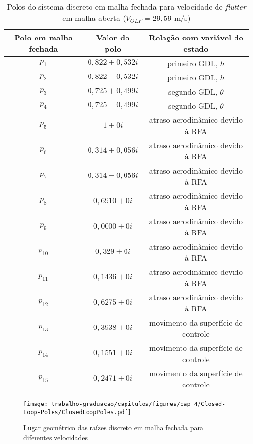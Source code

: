 \begin{table}[h]
\centering
\caption{Polos do sistema discreto em malha fechada para velocidade de \textit{flutter} em malha aberta ($V_{OLF} = 29,59$ m/s)}
\begin{tabular}{ccc} 
Polo em malha fechada & Valor do polo & Relação com variável de estado \\ \hline
$p_{1} $  & $0,822 + 0,532i$ & primeiro \gls{GDL}, $h$                  \\
$p_{2} $  & $0,822 - 0,532i$ & primeiro \gls{GDL}, $h$                  \\
$p_{3} $  & $0,725 + 0,499i$ & segundo \gls{GDL}, $\theta$              \\
$p_{4} $  & $0,725 - 0,499i$ & segundo \gls{GDL}, $\theta$              \\
$p_{5} $  & $1 + 0i$ &  atraso aerodinâmico devido à \gls{RFA}          \\
$p_{6} $  & $0,314 + 0,056i$ & atraso aerodinâmico devido à \gls{RFA}   \\
$p_{7} $  & $0,314 - 0,056i$ & atraso aerodinâmico devido à \gls{RFA}   \\
$p_{8} $  & $0,6910 + 0i$ & atraso aerodinâmico devido à \gls{RFA}      \\
$p_{9} $  & $0,0000 + 0i$ & atraso aerodinâmico devido à \gls{RFA}      \\
$p_{10} $ & $0,329 + 0i$ & atraso aerodinâmico devido à \gls{RFA}       \\
$p_{11} $ & $0,1436 + 0i$ & atraso aerodinâmico devido à \gls{RFA}      \\
$p_{12} $ & $0,6275 + 0i$ & atraso aerodinâmico devido à \gls{RFA}      \\
$p_{13} $ & $0,3938 + 0i$ & movimento da superfície de controle         \\
$p_{14} $ & $0,1551 + 0i$ & movimento da superfície de controle         \\
$p_{15} $ & $0,2471 + 0i$ & movimento da superfície de controle         \\
\hline
\end{tabular}
\label{tab:VOLF-ClosedLoop-Poles}
\end{table}

\begin{figure}[ht!]
    \centering
    \caption{Lugar geométrico das raízes discreto em malha fechada para diferentes velocidades}
    \noindent\texttt{[image: trabalho-graduacao/capitulos/figures/cap\_4/Closed-Loop-Poles/ClosedLoopPoles.pdf]}

    \label{fig:ClosedLoop-Poles}
\end{figure}

